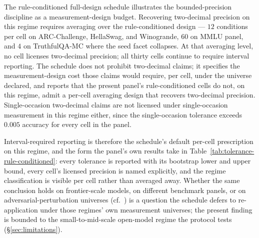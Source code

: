 \documentclass[11pt]{article}
\begin{document}
The rule-conditioned full-design schedule illustrates the bounded-precision discipline as a measurement-design budget. Recovering two-decimal precision on this regime requires averaging over the rule-conditioned design --- $12$ conditions per cell on ARC-Challenge, HellaSwag, and Winogrande, $60$ on MMLU panel, and $4$ on TruthfulQA-MC where the seed facet collapses. At that averaging level, no cell licenses two-decimal precision; all thirty cells continue to require interval reporting. The schedule does not prohibit two-decimal claims; it specifies the measurement-design cost those claims would require, per cell, under the universe declared, and reports that the present panel's rule-conditioned cells do not, on this regime, admit a per-cell averaging design that recovers two-decimal precision. Single-occasion two-decimal claims are not licensed under single-occasion measurement in this regime either, since the single-occasion tolerance exceeds $0.005$ accuracy for every cell in the panel.

Interval-required reporting is therefore the schedule's default per-cell prescription on this regime, and the form the panel's own results take in Table~\ref{tab:tolerance-rule-conditioned}: every tolerance is reported with its bootstrap lower and upper bound, every cell's licensed precision is named explicitly, and the regime classification is visible per cell rather than averaged away. Whether the same conclusion holds on frontier-scale models, on different benchmark panels, or on adversarial-perturbation universes (cf.~\citet{romanou2026brittlebench}) is a question the schedule defers to re-application under those regimes' own measurement universes; the present finding is bounded to the small-to-mid-scale open-model regime the protocol tests (§\ref{sec:limitations}).
\end{document}
